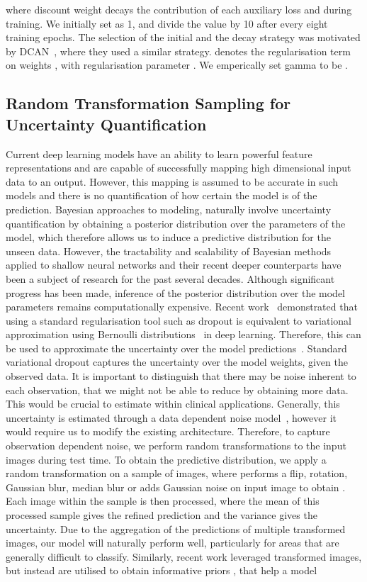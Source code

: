 \documentclass[3p]{elsarticle}
\begin{document}
\noindent where discount weight  decays the contribution of each auxiliary loss  and  during training.  We initially set  as 1, and divide the value by 10 after every eight training epochs. The selection of the initial  and the decay strategy was motivated by DCAN~\cite{chen2017dcan}, where they used a similar strategy.  denotes the regularisation term on weights , with regularisation parameter . We emperically set gamma to be .

\subsection{Random Transformation Sampling for Uncertainty Quantification}

Current deep learning models have an ability to learn powerful feature representations and are capable of successfully mapping high dimensional input data to an output. However, this mapping is assumed to be accurate in such models and there is no quantification of how certain the model is of the prediction. Bayesian approaches to modeling, naturally involve uncertainty quantification by obtaining a posterior distribution over the parameters of the model, which therefore allows us to induce a predictive distribution for the unseen data. However, the tractability and scalability of Bayesian methods applied to shallow neural networks and their recent deeper counterparts have been a subject of research for the past several decades. Although significant progress has been made, inference of the posterior distribution over the model parameters remains computationally expensive. Recent work~\citep{gal2016dropout} demonstrated that using a standard regularisation tool such as dropout is equivalent to variational approximation using Bernoulli distributions~\citep{bishop2012pattern} in deep learning. Therefore, this can be used to approximate the uncertainty over the model predictions~\citep{Gal2016Uncertainty}. Standard variational dropout captures the uncertainty over the model weights, given the observed data. It is important to distinguish that there may be noise inherent to each observation, that we might not be able to reduce by obtaining more data. This would be crucial to estimate within clinical applications. Generally, this uncertainty is estimated through a data dependent noise model~\citep{kendall2017uncertainties}, however it would require us to modify the existing architecture. Therefore, to capture observation dependent noise, we perform random transformations to the input images during test time. To obtain the predictive distribution, we apply a random transformation  on a sample of  images, where  performs a flip, rotation, Gaussian blur, median blur or adds Gaussian noise on input image  to obtain . Each image within the sample is then processed, where the mean of this processed sample gives the refined prediction and the variance gives the uncertainty. Due to the aggregation of the predictions of multiple transformed images, our model will naturally perform well, particularly for areas that are generally difficult to classify. Similarly, recent work leveraged transformed images, but instead are utilised to obtain informative priors \citep{nalisnick2018learning}, that help a model 
\end{document}

